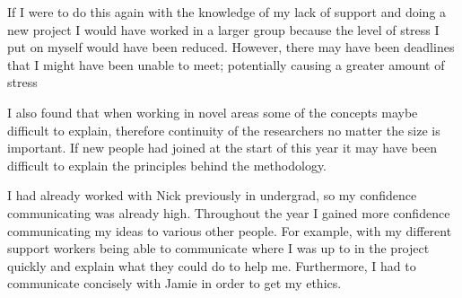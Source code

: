 If I were to do this again with the knowledge of my lack of support and doing a new project I would have worked in a larger group because the level of stress I put on myself would have been reduced. However, there may have been deadlines that I might have been unable to meet; potentially causing a greater amount of stress




I also found that when working in novel areas some of the concepts maybe difficult to explain, therefore continuity of the researchers no matter the size is important. If new people had joined at the start of this year it may have been difficult to explain the principles behind the methodology. 

I had already worked with Nick previously in undergrad, so my confidence communicating was already high. Throughout the year I gained more confidence communicating my ideas to various other people. For example, with my different support workers being able to communicate where I was up to in the project quickly and explain what they could do to help me. Furthermore, I had to communicate concisely with Jamie in order to get my ethics. 




